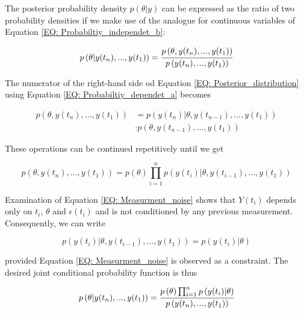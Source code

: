 \documentclass[../Article_Model_Parameters.tex]{subfiles}
\begin{document}
The posterior probability density $p(\theta|y)$ can be expressed as the ratio of two probability densities if we make use of the analogue for continuous variables of Equation \ref{EQ: Probabiltiy_independet_b}:

{\footnotesize
	\begin{align} \label{EQ: Posterior_distribution}
		p\left( \theta| y(t_n),...,y(t_1) \right) = \cfrac{p\left( \theta, y(t_n),...,y(t_1) \right)}{p\left( y(t_n),...,y(t_1) \right)}
\end{align} }

The numerator of the right-hand side od Equation \ref{EQ: Posterior_distribution} using Equation \ref{EQ: Probabiltiy_dependet_a} becomes 

{\footnotesize
	\begin{equation}
		\begin{split}
			p\left( \theta,y(t_n),...,y(t_1) \right) &= p\left( y(t_n)|\theta,y(t_{n-1}),...,y(t_1) \right) \\ &\cdot p\left( \theta,y(t_{n-1}),...,y(t_1) \right)
		\end{split}
\end{equation} }

These operations can be continued repetitively until we get

{\footnotesize
	\begin{equation}
		p\left( \theta, y(t_n),...,y(t_1) \right) = p\left( \theta \right) \prod_{i=1}^{n} p\left( y(t_i)|\theta, y(t_{i-1}),...,y(t_1) \right)
\end{equation} }

Examination of Equation \ref{EQ: Measurment_noise} shows that $ Y(t_i)$ depends only on $t_i$, $\theta$ and $\epsilon(t_i)$ and is not conditioned by any previous measurement. Consequently, we can write 

{\footnotesize
	\begin{equation}
		p\left( y(t_i)|\theta, y(t_{i-1}),...,y(t_1) \right) = p\left( y(t_i)|\theta \right)
\end{equation} }

provided Equation \ref{EQ: Measurment_noise} is observed as a constraint. The desired joint conditional probability function is thus

{\footnotesize
	\begin{equation}
		p\left( \theta| y(t_n),...,y(t_1) \right) = \cfrac{p\left( \theta \right) \prod_{i=1}^{n} p\left( y(t_i)|\theta \right) }{p\left( y(t_n),...,y(t_1) \right)}
\end{equation} }
\end{document}
